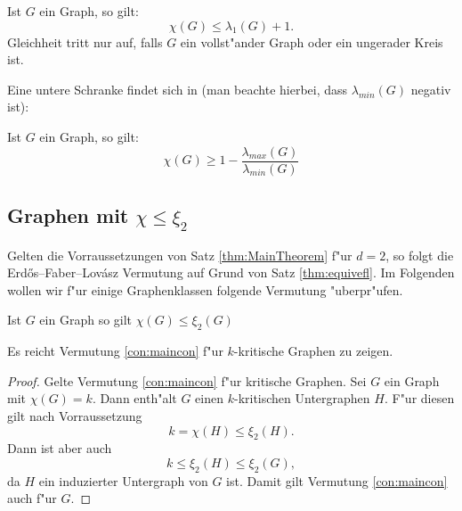 \begin{theorem}
  Ist $G$ ein Graph, so gilt: 
  $$\chi(G) \leq \lambda_{1}(G) +1.$$
  Gleichheit tritt nur auf, falls $G$ ein vollst"ander Graph oder ein ungerader Kreis ist.
  \label{thm:wilfev}
\end{theorem}

Eine untere Schranke findet sich in \cite{Hoffman70} (man beachte hierbei, dass $\lambda_{min}(G)$ negativ ist):

\begin{theorem}
  Ist $G$ ein Graph, so gilt:
  $$\chi(G) \geq 1 - \frac{\lambda_{max}(G)}{\lambda_{min}(G)}$$
  \label{thm:Hoffmanev}
\end{theorem}

\subsection{Graphen mit $\chi \leq \xi_{2}$}

Gelten die Vorraussetzungen von Satz \ref{thm:MainTheorem} f"ur $d=2$, so folgt die Erd\H{o}s--Faber--Lov\'asz Vermutung auf Grund von Satz \ref{thm:equivefl}. Im Folgenden wollen wir f"ur einige Graphenklassen folgende Vermutung "uberpr"ufen.
\begin{conjecture}
  Ist $G$ ein Graph so gilt $\chi(G) \leq \xi_{2}(G)$
  \label{con:maincon}
\end{conjecture}

\begin{remark}
  Es reicht Vermutung \ref{con:maincon} f"ur $k$-kritische Graphen zu zeigen. 
\end{remark}

\begin{proof}
  Gelte Vermutung \ref{con:maincon} f"ur kritische Graphen.
  Sei $G$ ein Graph mit $\chi(G) = k$. Dann enth"alt $G$ einen $k$-kritischen Untergraphen $H$. F"ur diesen gilt nach Vorraussetzung $$k= \chi(H) \leq \xi_{2}(H).$$ Dann ist aber auch $$k \leq \xi_{2}(H) \leq \xi_{2}(G) ,$$ da $H$ ein induzierter Untergraph von $G$ ist.  Damit gilt Vermutung \ref{con:maincon} auch f"ur $G$.
\end{proof}

